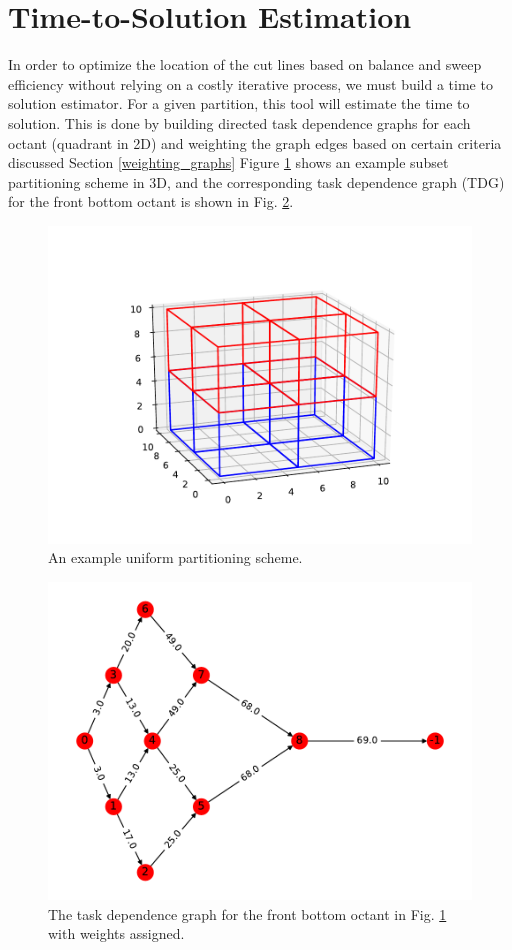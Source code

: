 \documentclass[11pt, letterpaper,titlepage,oneside]{article}
\begin{document}
\section{Time-to-Solution Estimation} \label{TOS}

In order to optimize the location of the cut lines based on balance and sweep efficiency without relying on a costly iterative process, we must build a time to solution estimator. For a given partition, this tool will estimate the time to solution. This is done by building directed task dependence graphs for each octant (quadrant in 2D) and weighting the graph edges based on certain criteria discussed Section \ref{weighting_graphs} Figure \ref{subset_plot} shows an example subset partitioning scheme in 3D, and the corresponding task dependence graph (TDG) for the front bottom octant is shown in Fig. \ref{digraph}.

\begin{figure}[H]
\centering
\includegraphics{../figures/subset_plot.pdf}
\caption{An example uniform partitioning scheme.}
\label{subset_plot}
\end{figure}

\begin{figure}[H]
\centering
\includegraphics{../figures/digraph.pdf}
\caption{The task dependence graph for the front bottom octant in Fig. \ref{subset_plot} with weights assigned.}
\label{digraph}
\end{figure}
\end{document}

